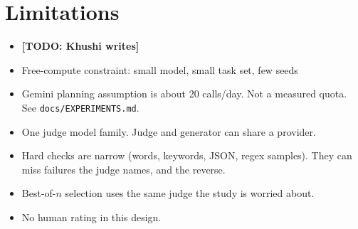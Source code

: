 \documentclass{article}
\newcommand{\todo}[1]{\textbf{[TODO: #1]}}
\begin{document}
\section{Limitations}
\begin{itemize}
  \item \todo{Khushi writes}
  \item Free-compute constraint: small model, small task set, few seeds
  \item Gemini planning assumption is about 20 calls/day. Not a measured quota. See \texttt{docs/EXPERIMENTS.md}.
  \item One judge model family. Judge and generator can share a provider.
  \item Hard checks are narrow (words, keywords, JSON, regex samples). They can miss failures the judge names, and the reverse.
  \item Best-of-$n$ selection uses the same judge the study is worried about.
  \item No human rating in this design.
\end{itemize}



\end{document}
